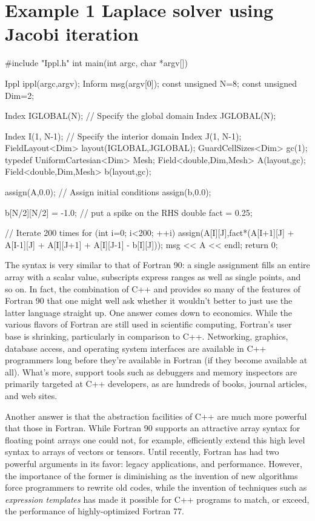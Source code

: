 \section{Example 1 Laplace solver using Jacobi iteration}
\begin{code}[caption={Laplace solver}]
#include "Ippl.h"
int main(int argc, char *argv[])
{
    Ippl ippl(argc,argv);
    Inform msg(argv[0]);
    const unsigned N=8;
    const unsigned Dim=2;

    Index IGLOBAL(N);  // Specify the global domain 
    Index JGLOBAL(N); 

    Index I(1, N-1); // Specify the interior domain
    Index J(1, N-1);
    FieldLayout<Dim> layout(IGLOBAL,JGLOBAL);
    GuardCellSizes<Dim> gc(1);
    typedef UniformCartesian<Dim> Mesh;
    Field<double,Dim,Mesh> A(layout,gc);
    Field<double,Dim,Mesh> b(layout,gc);

    assign(A,0.0);  // Assign initial conditions
    assign(b,0.0);

    b[N/2][N/2] = -1.0;  // put a spike on the RHS 
    double fact = 0.25;

    // Iterate 200 times
    for (int i=0; i<200; ++i) {
        assign(A[I][J],fact*(A[I+1][J] +
                             A[I-1][J] +
                             A[I][J+1] +
                             A[I][J-1] - b[I][J]));
    }                                                                                                                                            
    msg << A << endl;
    return 0;
}
\end{code}
The syntax is very similar to that of Fortran 90: a single assignment fills an entire array with a scalar value, subscripts express ranges as well as single points, and so on. In fact, the combination of C++ and \ippl provides so many of the features of Fortran 90 that one might well ask whether it wouldn't better to just use the latter language straight up. One answer comes down to economics. While the various flavors of Fortran are still used in scientific computing, Fortran's user base is shrinking, particularly in comparison to C++. Networking, graphics, database access, and operating system interfaces are available in C++ programmers long before they're available in Fortran (if they become available at all). What's more, support tools such as debuggers and memory inspectors are primarily targeted at C++ developers, as are hundreds of books, journal articles, and web sites.

Another answer is that the abstraction facilities of C++ are much more powerful that those in Fortran. While Fortran 90 supports an attractive array syntax for floating point arrays one could not, for example, efficiently extend this high level syntax to arrays of vectors or tensors. Until recently, Fortran has had two powerful arguments in its favor: legacy applications, and performance. However, the importance of the former is diminishing as the invention of new algorithms force programmers to rewrite old codes, while the invention of techniques such as {\it expression templates} has made it possible for C++ programs to match, or exceed, the performance of highly-optimized Fortran 77. 


